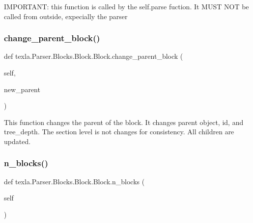\begin{DoxyVerb}IMPORTANT: this function is called by the self.parse fuction.
It MUST NOT be called from outside, expecially the parser
\end{DoxyVerb}
 \hypertarget{classtexla_1_1Parser_1_1Blocks_1_1Block_1_1Block_a5007c8a33e96707e02068ec65c30544a}{}\label{classtexla_1_1Parser_1_1Blocks_1_1Block_1_1Block_a5007c8a33e96707e02068ec65c30544a} 
\subsubsection{\texorpdfstring{change\+\_\+parent\+\_\+block()}{change\_parent\_block()}}
{\footnotesize\ttfamily def texla.\+Parser.\+Blocks.\+Block.\+Block.\+change\+\_\+parent\+\_\+block (\begin{DoxyParamCaption}\item[{}]{self,  }\item[{}]{new\+\_\+parent }\end{DoxyParamCaption})}

\begin{DoxyVerb}This function changes the parent of the
block. It changes parent object, id, and tree_depth.
The section level is not changes for consistency.
All children are updated.
\end{DoxyVerb}
 \hypertarget{classtexla_1_1Parser_1_1Blocks_1_1Block_1_1Block_a5add9bf131b1916f0220363912d1baec}{}\label{classtexla_1_1Parser_1_1Blocks_1_1Block_1_1Block_a5add9bf131b1916f0220363912d1baec} 
\subsubsection{\texorpdfstring{n\+\_\+blocks()}{n\_blocks()}}
{\footnotesize\ttfamily def texla.\+Parser.\+Blocks.\+Block.\+Block.\+n\+\_\+blocks (\begin{DoxyParamCaption}\item[{}]{self }\end{DoxyParamCaption})}

